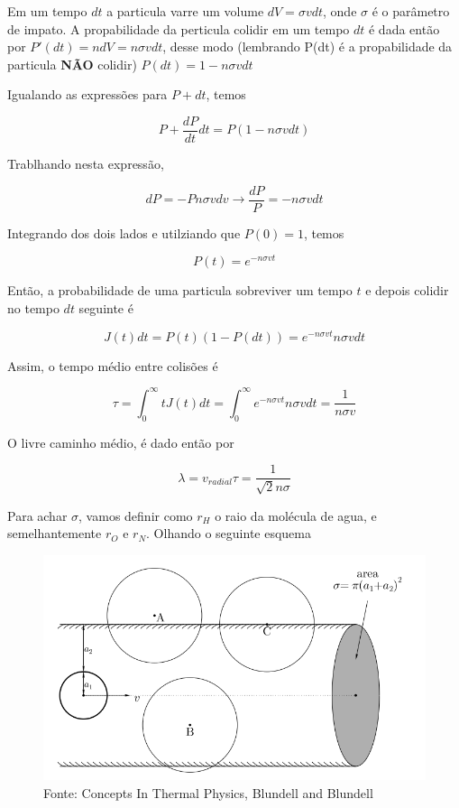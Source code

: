 \documentclass[11pt]{article}
\begin{document}
\begin{pproblem}
\begin{pssolution*}{}{}
\begin{alternativas}
    Em um tempo \(dt\) a particula varre um volume \(dV = \sigma v dt\), onde \(\sigma\) é o parâmetro de impato. A propabilidade da perticula colidir em um tempo \(dt\) é dada então por \(P'(dt) = ndV = n\sigma v dt\), desse modo (lembrando P(dt) é a propabilidade da particula \textbf{NÃO} colidir) \(P(dt) = 1-n\sigma vdt\)

    Igualando as expressões para \(P+dt\), temos 

    \[P + \frac{dP}{dt}dt = P(1-n\sigma v dt)\]

    Trablhando nesta expressão, 

    \[dP = -Pn\sigma vdv \rightarrow \frac{dP}{P} = -n\sigma v dt\]

    Integrando dos dois lados e utilziando que \(P(0)=1\), temos 

    \[P(t) = e^{-n\sigma vt}\]

    Então, a probabilidade de uma particula sobreviver um tempo \(t\) e depois colidir no tempo \(dt\) seguinte é 

    \[J(t)dt = P(t)(1-P(dt)) = e^{-n\sigma v t} n\sigma v dt\]

    Assim, o tempo médio entre colisões é 

    \[\tau = \int_0^\infty t J(t)dt = \int_0^\infty e^{-n\sigma v t} n\sigma v dt = \frac{1}{n\sigma v}\]

    O livre caminho médio, é dado então por 

    \[\lambda = v_{radial}\tau = \frac{1}{\sqrt{2}n\sigma}\]

    Para achar \(\sigma\), vamos definir como \(r_H\) o raio da molécula de agua, e semelhantemente \(r_O\) e \(r_N\). Olhando o seguinte esquema 

    \begin{figure}[H]
        \centering
        \includegraphics[width= 0.7\linewidth]{imagens/secaotransversal.png}
        \caption{Fonte: Concepts In Thermal Physics, Blundell and Blundell}
    \end{figure}


\end{alternativas}
\end{pssolution*}
\end{pproblem}
\end{document}
